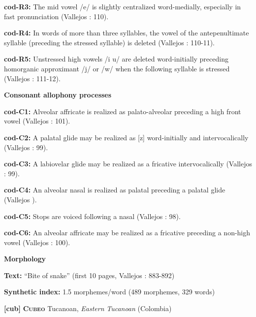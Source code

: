 \textbf{cod-R3:} The mid vowel /e/ is slightly centralized word-medially, especially in fast pronunciation (Vallejos \citealt{Yopán2010}: 110).



\textbf{cod-R4:} In words of more than three syllables, the vowel of the antepenultimate syllable (preceding the stressed syllable) is deleted (Vallejos \citealt{Yopán2010}: 110-11).



\textbf{cod-R5:} Unstressed high vowels /i u/ are deleted word-initially preceding homorganic approximant /j/ or /w/ when the following syllable is stressed (Vallejos \citealt{Yopán2010}: 111-12).



\textbf{Consonant allophony processes}



\textbf{cod-C1:} Alveolar affricate is realized as palato-alveolar preceding a high front vowel (Vallejos \citealt{Yopán2010}: 101).



\textbf{cod-C2:} A palatal glide may be realized as [z] word-initially and intervocalically (Vallejos \citealt{Yopán2010}: 99).



\textbf{cod-C3:} A labiovelar glide may be realized as a fricative intervocalically (Vallejos \citealt{Yopán2010}: 99).



\textbf{cod-C4:} An alveolar nasal is realized as palatal preceding a palatal glide (Vallejos \citealt{Yopán2010}).



\textbf{cod-C5:} Stops are voiced following a nasal (Vallejos \citealt{Yopán2010}: 98).



\textbf{cod-C6:} An alveolar affricate may be realized as a fricative preceding a non-high vowel (Vallejos \citealt{Yopán2010}: 100).



\textbf{Morphology}



\textbf{Text:} “Bite of snake” (first 10 pages, Vallejos \citealt{Yopán2010}: 883-892)



\textbf{Synthetic index:} 1.5 morphemes/word (489 morphemes, 329 words)



\textbf{[cub]}   \textbf{\textsc{Cubeo}}    Tucanoan, \textit{Eastern} \textit{Tucanoan} (Colombia)



